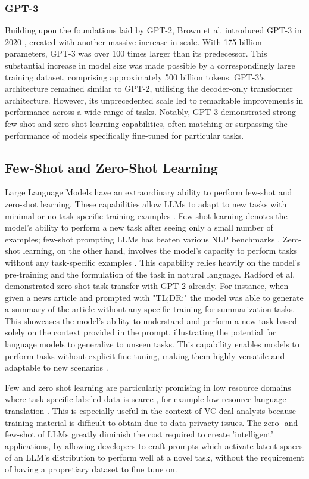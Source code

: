 \documentclass[a4paper, oneside]{discothesis}
\begin{document}
\subsubsection{GPT-3}
Building upon the foundations laid by GPT-2, Brown et al. introduced GPT-3 in 2020 \cite{brown2020language}, created with another massive increase in scale. With 175 billion parameters, GPT-3 was over 100 times larger than its predecessor. 
This substantial increase in model size was made possible by a correspondingly large training dataset, comprising approximately 500 billion tokens.
GPT-3's architecture remained similar to GPT-2, utilising the decoder-only transformer architecture. 
However, its unprecedented scale led to remarkable improvements in performance across a wide range of tasks. Notably, GPT-3 demonstrated strong few-shot and zero-shot learning capabilities, often matching or surpassing the performance of models specifically fine-tuned for particular tasks.

\subsection{Few-Shot and Zero-Shot Learning}
Large Language Models have an extraordinary ability to perform few-shot and zero-shot learning. These capabilities allow LLMs to adapt to new tasks with minimal or no task-specific training examples \cite{brown2020language}.
Few-shot learning denotes the model's ability to perform a new task after seeing only a small number of examples; few-shot prompting LLMs has beaten various NLP benchmarks \cite{lin2022fewshotlearningmultilinguallanguage}. 
Zero-shot learning, on the other hand, involves the model's capacity to perform tasks without any task-specific examples \cite{xian2018zero}. 
This capability relies heavily on the model's pre-training and the formulation of the task in natural language. 
Radford et al. \cite{radford2019language} demonstrated zero-shot task transfer with GPT-2 already. For instance, when given a news article and prompted with "TL;DR:" the model was able to generate a summary of the article without any specific training for summarization tasks. This showcases the model's ability to understand and perform a new task based solely on the context provided in the prompt, illustrating the potential for language models to generalize to unseen tasks. This capability enables models to perform tasks without explicit fine-tuning, making them highly versatile and adaptable to new scenarios \cite{min2024rethinking}.

Few and zero shot learning are particularly promising in low resource domains where task-specific labeled data is scarce \cite{hedderich2021survey}, for example low-resource language translation \cite{garcia2020multilingual}. This is especially useful in the context of VC deal analysis because training material is difficult to obtain due to data privacty issues. The zero- and few-shot  of LLMs greatly diminish the cost required to create 'intelligent' applications, by allowing developers to craft prompts which activate latent spaces of an LLM's distribution to perform well at a novel task, without the requirement of having a propretiary dataset to fine tune on.
\end{document}
